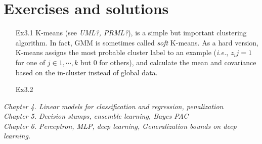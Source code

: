 \documentclass{article}
\begin{document}
\section{Exercises and solutions}
\begin{itemize}
\item[Ex3.1] K-means (see \textit{UML?, PRML?}), is a simple but important clustering algorithm. In fact, GMM is sometimes called \textit{soft} K-means. As a hard version, K-means assigns the most probable cluster label to an example (\textit{i.e.}, $z_ij=1$ for one of $j\in{1,\cdots,k}$ but 0 for others), and calculate the mean and covariance based on the in-cluster instead of global data.
\item[Ex3.2]

\end{itemize}
\textit{
	Chapter 4. Linear models for classification and regression, penalization \\
	  Chapter 5. Decision stumps, ensemble learning, Bayes PAC \\
      Chapter 6. Perceptron, MLP, deep learning, Generalization bounds on deep learning.}
\end{document}
